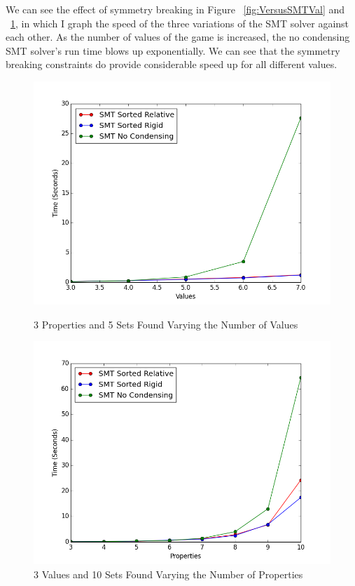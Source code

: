 \documentclass[pageno]{jpaper}
\begin{document}
We can see the effect of symmetry breaking in Figure ~\ref{fig:VersusSMTVal} and ~\ref{fig:VersusSMTProp}, in which I graph the speed of the three variations of the SMT solver against each other. As the number of values of the game is increased, the no condensing SMT solver's run time blows up exponentially. We can see that the symmetry breaking constraints do provide considerable speed up for all different values. 

\begin{figure}[htbb]
\begin{minipage}[b]{0.5\linewidth}
\centering
\includegraphics[width=.75\linewidth]{VersusSMTVAL-v34567p3n5.png}
\caption{3 Properties and 5 Sets Found Varying the Number of Values}
\label{fig:VersusSMTVal}
\end{minipage}
\hspace{0.5cm}
\begin{minipage}[b]{0.5\linewidth}
\centering
\includegraphics[width=.75\linewidth]{VersusSMTPROP-v3p345678910n5.png}
\caption{3 Values and 10 Sets Found Varying the Number of Properties}
\label{fig:VersusSMTProp}
\end{minipage}
\end{figure}
\end{document}
